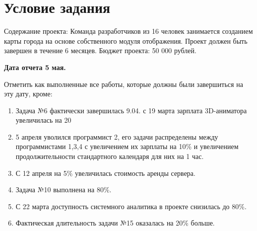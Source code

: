 \section{Условие задания}

Содержание проекта: Команда разработчиков из 16 человек занимается созданием карты города на основе собственного модуля отображения. Проект должен быть завершен в течение 6 месяцев. Бюджет проекта: 50 000 рублей.

\textbf{Дата отчета 5 мая.}

Отметить как выполненные все работы, которые должны были завершиться на эту дату, кроме:

\begin{enumerate}
    \item Задача №6 фактически завершилась 9.04. с 19 марта зарплата 3D-аниматора увеличилась на 20%
    \item 5 апреля уволился программист 2, его задачи распределены между программистами 1,3,4 с увеличением их зарплаты на 10\% и увеличением продолжительности стандартного календаря для них на 1 час.
    \item С 12 апреля на 5\% увеличилась стоимость аренды сервера.
    \item Задача №10 выполнена на 80\%.
    \item С 22 марта доступность системного аналитика в проекте снизилась до 80\%.
    \item Фактическая длительность задачи №15 оказалась на 20\% больше.
\end{enumerate}
